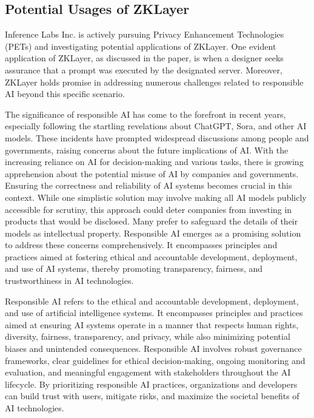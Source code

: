 \documentclass[conference]{IEEEtran}
\begin{document}
\subsection{Potential Usages of ZKLayer}

Inference Labs Inc. is actively pursuing Privacy Enhancement Technologies (PETs) and investigating potential applications of ZKLayer. One evident application of ZKLayer, as discussed in the paper, is when a designer seeks assurance that a prompt was executed by the designated server. Moreover, ZKLayer holds promise in addressing numerous challenges related to responsible AI beyond this specific scenario.

The significance of responsible AI has come to the forefront in recent years, especially following the startling revelations about ChatGPT, Sora, and other AI models. These incidents have prompted widespread discussions among people and governments, raising concerns about the future implications of AI. With the increasing reliance on AI for decision-making and various tasks, there is growing apprehension about the potential misuse of AI by companies and governments. Ensuring the correctness and reliability of AI systems becomes crucial in this context. While one simplistic solution may involve making all AI models publicly accessible for scrutiny, this approach could deter companies from investing in products that would be disclosed. Many prefer to safeguard the details of their models as intellectual property. Responsible AI emerges as a promising solution to address these concerns comprehensively. It encompasses principles and practices aimed at fostering ethical and accountable development, deployment, and use of AI systems, thereby promoting transparency, fairness, and trustworthiness in AI technologies.

Responsible AI refers to the ethical and accountable development, deployment, and use of artificial intelligence systems. It encompasses principles and practices aimed at ensuring AI systems operate in a manner that respects human rights, diversity, fairness, transparency, and privacy, while also minimizing potential biases and unintended consequences. Responsible AI involves robust governance frameworks, clear guidelines for ethical decision-making, ongoing monitoring and evaluation, and meaningful engagement with stakeholders throughout the AI lifecycle. By prioritizing responsible AI practices, organizations and developers can build trust with users, mitigate risks, and maximize the societal benefits of AI technologies.
\end{document}
